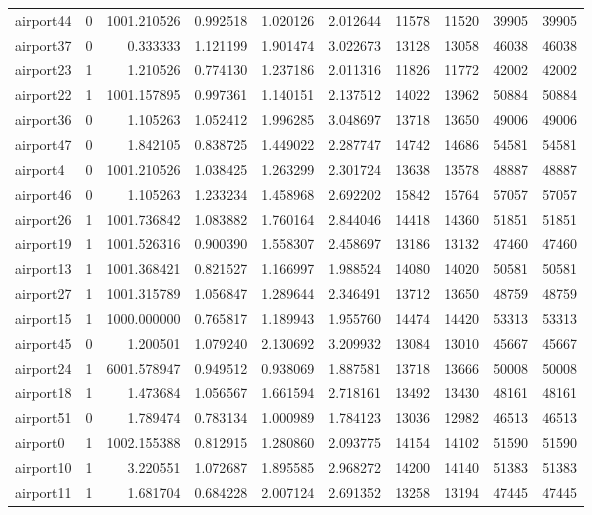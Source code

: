 \begin{longtable}{|l|r|r|r|r|r|r|r|r|r|}
airport44 & 0 & 1001.210526 & 0.992518 & 1.020126 & 2.012644 & 11578 & 11520 & 39905 & 39905 \\
airport37 & 0 & 0.333333 & 1.121199 & 1.901474 & 3.022673 & 13128 & 13058 & 46038 & 46038 \\
airport23 & 1 & 1.210526 & 0.774130 & 1.237186 & 2.011316 & 11826 & 11772 & 42002 & 42002 \\
airport22 & 1 & 1001.157895 & 0.997361 & 1.140151 & 2.137512 & 14022 & 13962 & 50884 & 50884 \\
airport36 & 0 & 1.105263 & 1.052412 & 1.996285 & 3.048697 & 13718 & 13650 & 49006 & 49006 \\
airport47 & 0 & 1.842105 & 0.838725 & 1.449022 & 2.287747 & 14742 & 14686 & 54581 & 54581 \\
airport4 & 0 & 1001.210526 & 1.038425 & 1.263299 & 2.301724 & 13638 & 13578 & 48887 & 48887 \\
airport46 & 0 & 1.105263 & 1.233234 & 1.458968 & 2.692202 & 15842 & 15764 & 57057 & 57057 \\
airport26 & 1 & 1001.736842 & 1.083882 & 1.760164 & 2.844046 & 14418 & 14360 & 51851 & 51851 \\
airport19 & 1 & 1001.526316 & 0.900390 & 1.558307 & 2.458697 & 13186 & 13132 & 47460 & 47460 \\
airport13 & 1 & 1001.368421 & 0.821527 & 1.166997 & 1.988524 & 14080 & 14020 & 50581 & 50581 \\
airport27 & 1 & 1001.315789 & 1.056847 & 1.289644 & 2.346491 & 13712 & 13650 & 48759 & 48759 \\
airport15 & 1 & 1000.000000 & 0.765817 & 1.189943 & 1.955760 & 14474 & 14420 & 53313 & 53313 \\
airport45 & 0 & 1.200501 & 1.079240 & 2.130692 & 3.209932 & 13084 & 13010 & 45667 & 45667 \\
airport24 & 1 & 6001.578947 & 0.949512 & 0.938069 & 1.887581 & 13718 & 13666 & 50008 & 50008 \\
airport18 & 1 & 1.473684 & 1.056567 & 1.661594 & 2.718161 & 13492 & 13430 & 48161 & 48161 \\
airport51 & 0 & 1.789474 & 0.783134 & 1.000989 & 1.784123 & 13036 & 12982 & 46513 & 46513 \\
airport0 & 1 & 1002.155388 & 0.812915 & 1.280860 & 2.093775 & 14154 & 14102 & 51590 & 51590 \\
airport10 & 1 & 3.220551 & 1.072687 & 1.895585 & 2.968272 & 14200 & 14140 & 51383 & 51383 \\
airport11 & 1 & 1.681704 & 0.684228 & 2.007124 & 2.691352 & 13258 & 13194 & 47445 & 47445 \\

\end{longtable}
